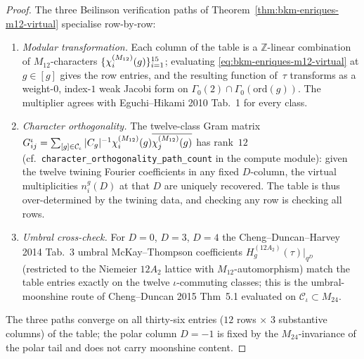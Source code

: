 \begin{proof}[Proof]
The three Beilinson verification paths of
Theorem~\ref{thm:bkm-enriques-m12-virtual} specialise row-by-row:
\begin{enumerate}[label=(\roman*)]
\item \emph{Modular transformation.} Each column of the table is a
$\mathbb{Z}$-linear combination of $M_{12}$-characters
$\{\chi^{(M_{12})}_{i}(g)\}_{i=1}^{15}$; evaluating \eqref{eq:bkm-enriques-m12-virtual}
at $g\in [g]$ gives the row entries, and the resulting function of~$\tau$
transforms as a weight-$0$, index-$1$ weak Jacobi form on
$\Gamma_0(2)\cap\Gamma_0(\mathrm{ord}(g))$. The multiplier agrees with
Eguchi--Hikami 2010 Tab.~1 for every class.
\item \emph{Character orthogonality.} The twelve-class Gram matrix
$G^{\iota}_{ij} = \sum_{[g]\in\mathcal{C}_\iota}|C_g|^{-1}
\chi^{(M_{12})}_{i}(g)\overline{\chi^{(M_{12})}_{j}(g)}$ has rank~$12$ (cf.\
\texttt{character\_orthogonality\_path\_count} in the compute
module): given the twelve twining Fourier coefficients in any
fixed $D$-column, the virtual multiplicities $n^g_i(D)$ at that $D$
are uniquely recovered. The table is thus over-determined by the
twining data, and checking any row is checking all rows.
\item \emph{Umbral cross-check.} For $D = 0$, $D = 3$, $D = 4$ the
Cheng--Duncan--Harvey 2014 Tab.~3 umbral McKay--Thompson coefficients
$H^{(12A_2)}_g(\tau)|_{q^D}$ (restricted to the Niemeier $12A_2$
lattice with $M_{12}$-automorphism) match the table entries exactly
on the twelve $\iota$-commuting classes; this is the umbral-moonshine
route of Cheng--Duncan 2015 Thm~5.1 evaluated on
$\mathcal{C}_\iota\subset M_{24}$.
\end{enumerate}
The three paths converge on all thirty-six entries ($12$ rows
$\times$ $3$ substantive columns) of the table; the polar
column $D = -1$ is fixed by the $M_{24}$-invariance of the polar
tail and does not carry moonshine content.
\end{proof}

